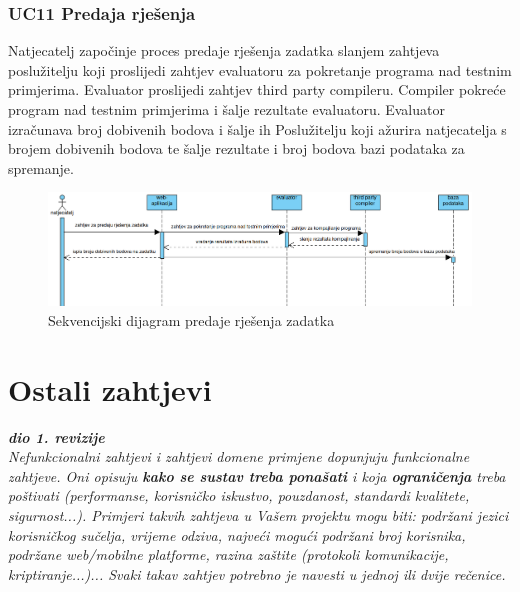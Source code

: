 				
				\clearpage 
				
				\subsubsection*{UC11 Predaja rješenja}
				
				Natjecatelj započinje proces predaje rješenja zadatka slanjem zahtjeva poslužitelju koji proslijedi zahtjev evaluatoru za pokretanje programa nad testnim primjerima. Evaluator proslijedi zahtjev third party compileru. Compiler pokreće program nad testnim primjerima i šalje rezultate evaluatoru. Evaluator izračunava broj dobivenih bodova i šalje ih Poslužitelju koji ažurira natjecatelja s brojem dobivenih bodova te šalje rezultate i broj bodova bazi podataka za spremanje.
				\vspace{20mm}

				\begin{figure}[htbp]
					\centering
					\includegraphics[width=\linewidth]{slike/predaja_rjesenja_zadatka.png}
					\caption{Sekvencijski dijagram predaje rješenja zadatka}\label{fig:seqdiag_rjesenja}
				\end{figure}


			\eject 
	
		\section{Ostali zahtjevi}
		
			\textbf{\textit{dio 1. revizije}}\\
		 
			 \textit{Nefunkcionalni zahtjevi i zahtjevi domene primjene dopunjuju funkcionalne zahtjeve. Oni opisuju \textbf{kako se sustav treba ponašati} i koja \textbf{ograničenja} treba poštivati (performanse, korisničko iskustvo, pouzdanost, standardi kvalitete, sigurnost...). Primjeri takvih zahtjeva u Vašem projektu mogu biti: podržani jezici korisničkog sučelja, vrijeme odziva, najveći mogući podržani broj korisnika, podržane web/mobilne platforme, razina zaštite (protokoli komunikacije, kriptiranje...)... Svaki takav zahtjev potrebno je navesti u jednoj ili dvije rečenice.}
			 
			 
			 
	